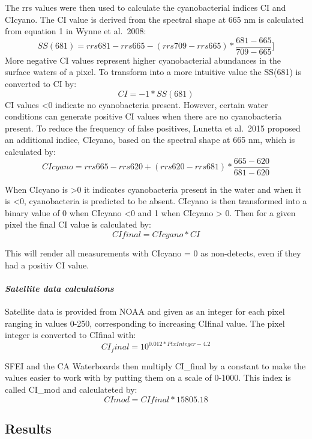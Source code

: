 \documentclass[]{article}
\let\oldparagraph\paragraph
\renewcommand{\paragraph}[1]{\oldparagraph{#1}\mbox{}}
\begin{document}
The rrs values were then used to calculate the cyanobacterial indices CI
and CIcyano. The CI value is derived from the spectral shape at 665 nm
is calculated from equation 1 in Wynne et al.~2008:
\[SS(681) = rrs681 - rrs665 - (rrs709 - rrs665) * \frac{681-665}{709-665}]\]
More negative CI values represent higher cyanobacterial abundances in
the surface waters of a pixel. To transform into a more intuitive value
the SS(681) is converted to CI by: \[CI = -1*SS(681)\] CI values
\textless0 indicate no cyanobacteria present. However, certain water
conditions can generate positive CI values when there are no
cyanobacteria present. To reduce the frequency of false positives,
Lunetta et al.~2015 proposed an additional indice, CIcyano, based on the
spectral shape at 665 nm, which is calculated by:
\[CIcyano = rrs665 - rrs620 + (rrs620 - rrs681) * \frac{665-620}{681-620}\]

When CIcyano is \textgreater0 it indicates cyanobacteria present in the
water and when it is \textless0, cyanobacteria is predicted to be
absent. CIcyano is then transformed into a binary value of 0 when
CIcyano \textless0 and 1 when CIcyano \textgreater{} 0. Then for a given
pixel the final CI value is calculated by: \[CIfinal = CIcyano * CI\]

This will render all measurements with CIcyano = 0 as non-detects, even
if they had a positiv CI value.

\hypertarget{satellite-data-calculations}{%
\paragraph{\texorpdfstring{\emph{Satellite data
calculations}}{Satellite data calculations}}\label{satellite-data-calculations}}

Satellite data is provided from NOAA and given as an integer for each
pixel ranging in values 0-250, corresponding to increasing CIfinal
value. The pixel integer is converted to CIfinal with:
\[CI_final = 10^{0.012 * PixInteger - 4.2} \]

SFEI and the CA Waterboards then multiply CI\_final by a constant to
make the values easier to work with by putting them on a scale of
0-1000. This index is called CI\_mod and calculateted by:
\[CImod = CIfinal * 15805.18\]

\hypertarget{results}{%
\subsection{\texorpdfstring{\textbf{Results}}{Results}}\label{results}}
\end{document}
